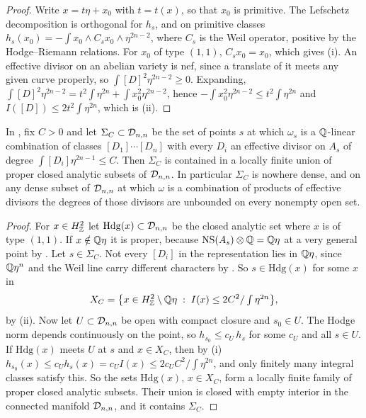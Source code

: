 \begin{proof}
Write $x=t\eta+x_{0}$ with $t=t(x)$, so that $x_{0}$ is primitive. The
Lefschetz decomposition is orthogonal for $h_{s}$, and on primitive classes
$h_{s}(x_{0})=-\int x_{0}\wedge C_{s}x_{0}\wedge\eta^{2n-2}$, where $C_{s}$ is
the Weil operator, positive by the Hodge--Riemann relations. For $x_{0}$ of type
$(1,1)$, $C_{s}x_{0}=x_{0}$, which gives (i). An effective divisor on an
abelian variety is nef, since a translate of it meets any given curve
properly, so $\int[D]^{2}\eta^{2n-2}\ge0$. Expanding,
$\int[D]^{2}\eta^{2n-2}=t^{2}\int\eta^{2n}+\int x_{0}^{2}\eta^{2n-2}$, hence
$-\int x_{0}^{2}\eta^{2n-2}\le t^{2}\int\eta^{2n}$ and
$I([D])\le2t^{2}\int\eta^{2n}$, which is (ii).
\end{proof}

\begin{proposition}\label{prop:divroute}
In , fix $C>0$ and let $\Sigma_{C}\subset\mathcal{D}_{n,n}$ be the
set of points $s$ at which $\omega_{s}$ is a $\mathbb{Q}$-linear combination of
classes $[D_{1}]\cdots[D_{n}]$ with every $D_{i}$ an effective divisor on
$A_{s}$ of degree $\int[D_{i}]\eta^{2n-1}\le C$. Then $\Sigma_{C}$ is
contained in a locally finite union of proper closed analytic subsets of
$\mathcal{D}_{n,n}$. In particular $\Sigma_{C}$ is nowhere dense, and on any dense
subset of $\mathcal{D}_{n,n}$ at which $\omega$ is a combination of products of
effective divisors the degrees of those divisors are unbounded on every
nonempty open set.
\end{proposition}

\begin{proof}
For $x\in H^{2}_{\mathbb{Z}}$ let $\mathrm{Hdg}(x)\subset\mathcal{D}_{n,n}$ be the
closed analytic set where $x$ is of type $(1,1)$. If $x\notin\mathbb{Q}\eta$ it is
proper, because $\mathrm{NS}(A_{s})\otimes\mathbb{Q}=\mathbb{Q}\eta$ at a very general point by
. Let $s\in\Sigma_{C}$. Not every $[D_{i}]$ in the
representation lies in $\mathbb{Q}\eta$, since $\mathbb{Q}\eta^{n}$ and the Weil line carry
different characters by . So $s\in\mathrm{Hdg}(x)$ for
some $x$ in
\[
  X_{C}=\bigl\{x\in H^{2}_{\mathbb{Z}}\setminus\mathbb{Q}\eta\;:\;
  I(x)\le 2C^{2}/\textstyle\int\eta^{2n}\bigr\},
\]
by (ii). Now let $U\subset\mathcal{D}_{n,n}$ be open with compact
closure and $s_{0}\in U$. The Hodge norm depends continuously on the point, so
$h_{s_{0}}\le c_{U}\,h_{s}$ for some $c_{U}$ and all $s\in U$. If
$\mathrm{Hdg}(x)$ meets $U$ at $s$ and $x\in X_{C}$, then by
(i)
$h_{s_{0}}(x)\le c_{U}h_{s}(x)=c_{U}I(x)\le 2c_{U}C^{2}/\int\eta^{2n}$, and
only finitely many integral classes satisfy this. So the sets
$\mathrm{Hdg}(x)$, $x\in X_{C}$, form a locally finite family of proper closed
analytic subsets. Their union is closed with empty interior in the connected
manifold $\mathcal{D}_{n,n}$, and it contains $\Sigma_{C}$.
\end{proof}

